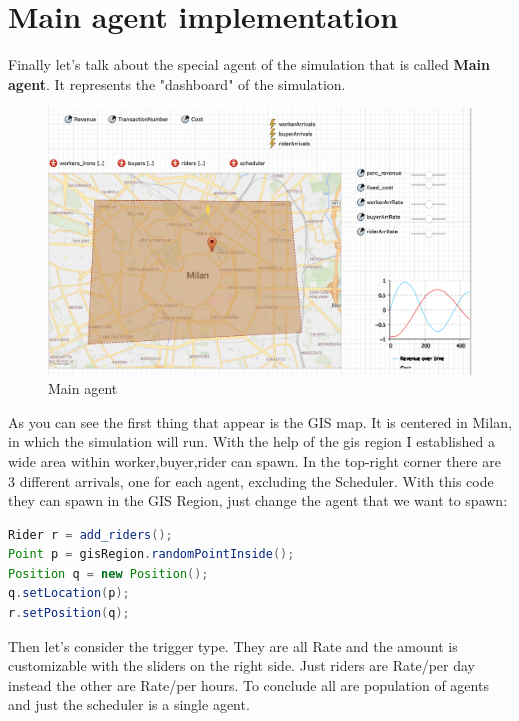 \section{Main agent implementation}
Finally let's talk about the special agent of the simulation that is called \textbf{Main agent}. It represents the "dashboard" of the simulation. 
\begin{figure}[hbtp]
\caption{Main agent }
\label{figure:main}
\centering
\includegraphics[scale=0.5]{../Images/main.png}
\end{figure}
As you can see the first thing that appear is the GIS map. It is centered in Milan, in which the simulation will run. With the help of the gis region I established a wide area within worker,buyer,rider can spawn. In the top-right corner there are 3 different arrivals, one for each agent, excluding the Scheduler.
With this code they can spawn in the GIS Region, just change the agent that we want to spawn:
\begin{lstlisting}[language=Java]
Rider r = add_riders();
Point p = gisRegion.randomPointInside();
Position q = new Position();
q.setLocation(p);
r.setPosition(q);
\end{lstlisting} 
Then let's consider the trigger type. They are all Rate and the amount is customizable with the sliders on the right side. Just riders are Rate/per day instead the other are Rate/per hours.
To conclude all are population of agents and just the scheduler is a single agent.
